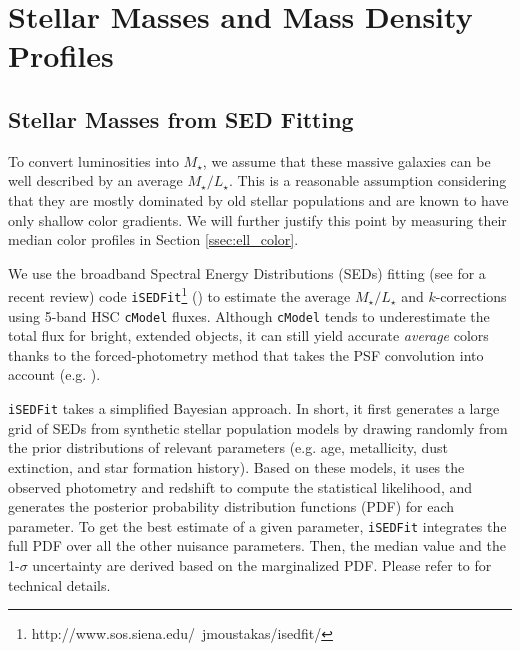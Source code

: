 \documentclass[a4paper,fleqn,usenatbib]{mnras}
\def\cmodel{\texttt{cModel}}
\def\mstar{{$M_{\star}$}}
\def\m2l{{$M_{\star}/L_{\star}$}}
\begin{document}
    
\section{Stellar Masses and Mass Density Profiles}
    \label{sec:mstar}
    
\subsection{Stellar Masses from SED Fitting}
    \label{ssec:isedfit}
   
    To convert luminosities into \mstar{}, we assume that these massive galaxies 
    can be well described by an average \m2l{}. 
    This is a reasonable assumption considering that they are mostly dominated by 
    old stellar populations and are known to have only shallow color gradients. 
    We will further justify this point by measuring their median color profiles in 
    Section \ref{ssec:ell_color}.

    We use the broadband Spectral Energy Distributions (SEDs) fitting 
    (see \citealt{Walcher2011} for a recent review) code 
    \texttt{iSEDFit}\footnote{http://www.sos.siena.edu/~jmoustakas/isedfit/} 
    (\citealt{Moustakas13}) to estimate the average \m2l{} and $k$-corrections using
    5-band HSC \cmodel{} fluxes.
    Although \cmodel{} tends to underestimate the total flux for bright, extended 
    objects, it can still yield accurate \emph{average} colors thanks to the 
    forced-photometry method that takes the PSF convolution into account
    (e.g. \citealt{SynPipe}). 

    \texttt{iSEDFit} takes a simplified Bayesian approach. 
    In short, it first generates a large grid of SEDs from synthetic stellar 
    population models by drawing randomly from the prior distributions of relevant
    parameters (e.g. age, metallicity, dust extinction, and star formation history).
    Based on these models, it uses the observed photometry and redshift to compute 
    the statistical likelihood, and generates the posterior probability distribution 
    functions (PDF) for each parameter.  
    To get the best estimate of a given parameter, \texttt{iSEDFit} integrates the 
    full PDF over all the other nuisance parameters.
    Then, the median value and the 1-$\sigma$ uncertainty are derived based on the 
    marginalized PDF. 
    Please refer to \citet{Moustakas13} for technical details. 
    
\end{document}
